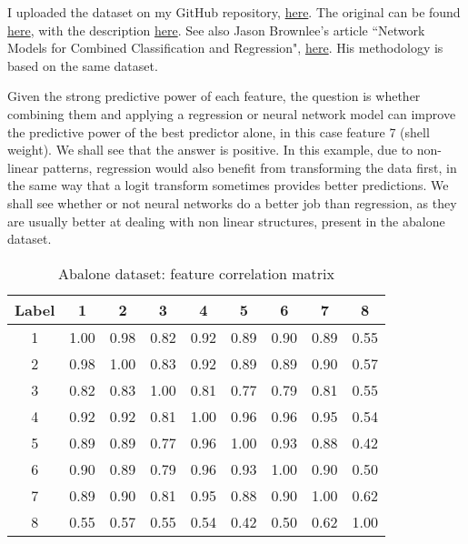 \documentclass[oneside,10pt]{book}
\begin{document}
I uploaded the dataset on my GitHub repository, \href{https://github.com/VincentGranville/Statistical-Optimization/blob/main/thinning_abalone.csv}{here}. The original can be found \href{https://raw.githubusercontent.com/jbrownlee/Datasets/master/abalone.csv}{here}, with the description
 \href{https://raw.githubusercontent.com/jbrownlee/Datasets/master/abalone.names}{here}. See also Jason Brownlee's article
 ``Network Models for Combined Classification and Regression", \href{https://machinelearningmastery.com/neural-network-models-for-combined-classification-and-regression/}{here}. His methodology is based on the same dataset.

Given the strong predictive power of each feature, the question is whether combining them and applying a regression or neural network model can improve the predictive power of the best predictor alone, in this case feature 7 (shell weight). We shall see that the answer is positive. In this example, due
 to non-linear patterns, regression would also benefit from transforming the data first, in the same way that a logit transform sometimes provides better predictions. We shall see
 whether or not neural networks do a better job than regression, as they are usually better at dealing with non linear structures, present 
 in the abalone dataset. 

\begin{table}[H]
\begin{center}
\begin{tabular}{|c|ccccccc|c|}
\hline
  Label & 1 &         2 &         3 &         4 &         5 &         6 &         7 &         8 \\
\hline
\hline
1  &1.00  &0.98  &0.82  &0.92  &0.89  &0.90  &0.89  &0.55\\
2  &0.98  &1.00  &0.83  &0.92  &0.89  &0.89  &0.90  &0.57\\
3  &0.82  &0.83  &1.00  &0.81  &0.77  &0.79  &0.81  &0.55\\
4  &0.92  &0.92  &0.81  &1.00  &0.96  &0.96  &0.95  &0.54\\
5  &0.89  &0.89  &0.77  &0.96  &1.00  &0.93  &0.88  &0.42\\
6  &0.90  &0.89  &0.79  &0.96  &0.93  &1.00  &0.90  &0.50\\
7  &0.89  &0.90  &0.81  &0.95  &0.88  &0.90  &1.00  &0.62\\
8  &0.55  &0.57  &0.55  &0.54  &0.42  &0.50  &0.62  &1.00\\
\hline
\end{tabular}
\caption{\label{choctreyur} Abalone dataset: feature correlation matrix}
\end{center}
\end{table}
\end{document}
